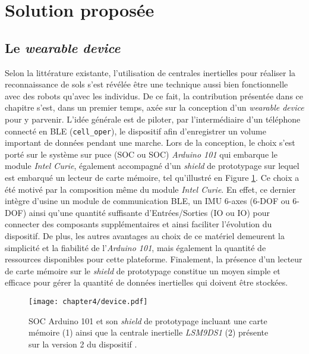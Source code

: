 \section{Solution proposée}

\subsection{Le \textit{wearable device}}

Selon la littérature existante, l'utilisation de centrales inertielles pour réaliser la reconnaissance de sols s'est révélée être une technique aussi bien fonctionnelle avec des robots qu'avec les individus. De ce fait, la contribution présentée dans ce chapitre s'est, dans un premier temps, axée sur la conception d'un \textit{wearable device} pour y parvenir. L'idée générale est de piloter, par l'intermédiaire d'un téléphone connecté en \acs{BLE} (\texttt{cell\_oper}), le dispositif afin d'enregistrer un volume important de données pendant une marche. Lors de la conception, le choix s'est porté sur le système sur puce (\acl{SOC} ou \acs{SOC}) \textit{Arduino 101} qui embarque le module \textit{Intel Curie}, également accompagné d'un \textit{shield} de prototypage sur lequel est embarqué un lecteur de carte mémoire, tel qu'illustré en Figure \ref{fig:device}. Ce choix a été motivé par la composition même du module \textit{Intel Curie}. En effet, ce dernier intègre d'usine un module de communication \acs{BLE}, un \acs{IMU} 6-axes (6-\acl{DOF} ou 6-\acs{DOF}) ainsi qu'une quantité suffisante d'Entrées/Sorties (\acl{IO} ou \acs{IO}) pour connecter des composants supplémentaires et ainsi faciliter l'évolution du dispositif. De plus, les autres avantages au choix de ce matériel demeurent la simplicité et la fiabilité de l'\textit{Arduino 101}, mais également la quantité de ressources disponibles pour cette plateforme. Finalement, la présence d'un lecteur de carte mémoire sur le \textit{shield} de prototypage constitue un moyen simple et efficace pour gérer la quantité de données inertielles qui doivent être stockées.

\begin{figure}[b!]
	\centering
	\texttt{[image: chapter4/device.pdf]}
        \caption[\acs{SOC} Arduino 101 et son \textit{shield} de prototypage incluant une carte mémoire (1) ainsi que la centrale inertielle \textit{LSM9DS1} (2) présente sur la version 2 du dispositif.]{\acs{SOC} Arduino 101 et son \textit{shield} de prototypage incluant une carte mémoire (1) ainsi que la centrale inertielle \textit{LSM9DS1} (2) présente sur la version 2 du dispositif \citep{Thullier2017}.}
	\label{fig:device}
\end{figure}

